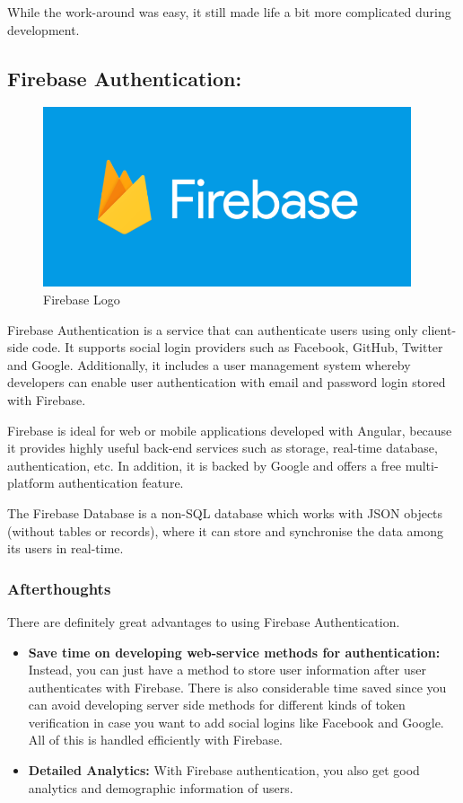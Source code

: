 While the work-around was easy, it still made life a bit more complicated during development.

\clearpage

\subsection{Firebase Authentication:}
\label{sec:TechnologyReviewFirebase}
\begin{figure}[H]
    \centering
    \includegraphics[width=\textwidth, height=150pt]{img/FireBaseLogo.PNG}
    \caption{Firebase Logo}
    \label{fig:my_label}
\end{figure}
Firebase Authentication is a service that can authenticate users using only client-side code. It supports social login providers such as Facebook, GitHub, Twitter and Google. Additionally, it includes a user management system whereby developers can enable user authentication with email and password login stored with Firebase.

\bigskip
Firebase is ideal for web or mobile applications developed with Angular, because it provides highly useful back-end services such as storage, real-time database, authentication, etc. In addition, it is backed by Google and offers a free multi-platform authentication feature.

The Firebase Database is a non-SQL database which works with JSON objects (without tables or records), where it can store and synchronise the data among its users in real-time.

\subsubsection{Afterthoughts}
There are definitely great advantages to using Firebase Authentication.


\begin{itemize}
    \item \textbf{Save time on developing web-service methods for authentication:} Instead, you can just have a method to store user information after user authenticates with Firebase. There is also considerable time saved since you can avoid developing server side methods for different kinds of token verification in case you want to add social logins like Facebook and Google. All of this is handled efficiently with Firebase.
    \item \textbf{Detailed Analytics:} With Firebase authentication, you also get good analytics and demographic information of users.
\end{itemize}


